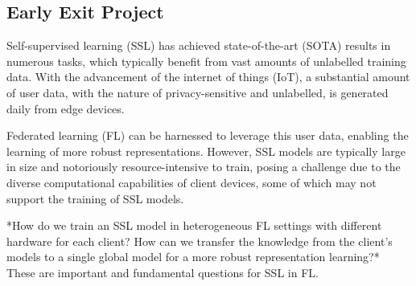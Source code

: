 \documentclass[withindex,glossary]{cam-thesis}
\begin{document}



\subsection{Early Exit Project}

Self-supervised learning (SSL) has achieved state-of-the-art (SOTA) results in numerous tasks, which typically benefit from vast amounts of unlabelled training data.  With the advancement of the internet of things (IoT), a substantial amount of user data, with the nature of privacy-sensitive and unlabelled, is generated daily from edge devices. 

Federated learning (FL) can be harnessed to leverage this user data, enabling the learning of more robust representations. However, SSL models are typically large in size and notoriously resource-intensive to train, posing a challenge due to the diverse computational capabilities of client devices, some of which may not support the training of SSL models.

*How do we train an SSL model in heterogeneous FL settings with different hardware for each client? How can we transfer the knowledge from the client’s models to a single global model for a more robust representation learning?* These are important and fundamental questions for SSL in FL.
\end{document}
